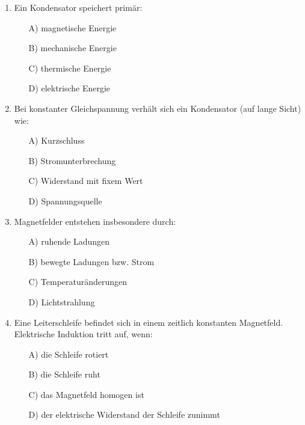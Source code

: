 \documentclass[a4paper,12pt]{article}
\newif\ifshowsolutions
\begin{document}
\begin{enumerate}[label=\textbf{\arabic*.}, leftmargin=*, itemsep=8pt]
\ifshowsolutions
Lösung: B
\fi

  \item Ein Kondensator speichert primär:
    \begin{itemize}[label=$\square$]
      \item[A)] magnetische Energie
      \item[B)] mechanische Energie
      \item[C)] thermische Energie
      \item[D)] elektrische Energie
    \end{itemize}

\ifshowsolutions
Lösung: D
\fi

  \item Bei konstanter Gleichspannung verhält sich ein Kondensator (auf lange Sicht) wie:
    \begin{itemize}[label=$\square$]
      \item[A)] Kurzschluss
      \item[B)] Stromunterbrechung
      \item[C)] Widerstand mit fixem Wert
      \item[D)] Spannungsquelle
    \end{itemize}

\ifshowsolutions
Lösung: B
\fi

  \item Magnetfelder entstehen insbesondere durch:
    \begin{itemize}[label=$\square$]
      \item[A)] ruhende Ladungen
      \item[B)] bewegte Ladungen bzw. Strom
      \item[C)] Temperaturänderungen
      \item[D)] Lichtstrahlung
    \end{itemize}

\ifshowsolutions
Lösung: B
\fi

  \item Eine Leiterschleife befindet sich in einem zeitlich konstanten Magnetfeld. Elektrische Induktion tritt auf, wenn:
    \begin{itemize}[label=$\square$]
      \item[A)] die Schleife rotiert
      \item[B)] die Schleife ruht
      \item[C)] das Magnetfeld homogen ist
      \item[D)] der elektrische Widerstand der Schleife zunimmt
    \end{itemize}


\end{enumerate}
\end{document}
